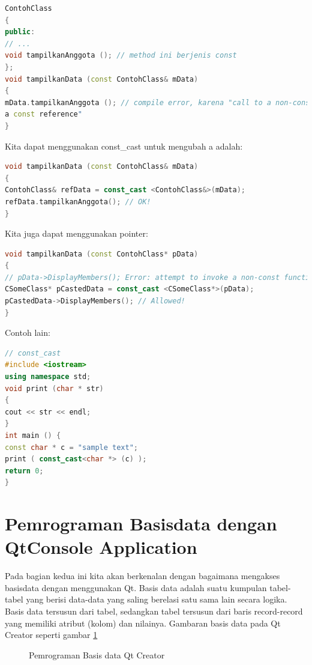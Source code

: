 \begin{lstlisting}[language=c++, numbers=none]
ContohClass
{
public:
// ...
void tampilkanAnggota (); // method ini berjenis const
};
void tampilkanData (const ContohClass& mData)
{
mData.tampilkanAnggota (); // compile error, karena "call to a non-const member using
a const reference"
}
\end{lstlisting}

Kita dapat menggunakan const\_cast untuk mengubah a adalah:

\begin{lstlisting}[language=c++, numbers=none]
void tampilkanData (const ContohClass& mData)
{
ContohClass& refData = const_cast <ContohClass&>(mData);
refData.tampilkanAnggota(); // OK!
}
\end{lstlisting}

Kita juga dapat menggunakan pointer:

\begin{lstlisting}[language=c++, numbers=none]
void tampilkanData (const ContohClass* pData)
{
// pData->DisplayMembers(); Error: attempt to invoke a non-const function!
CSomeClass* pCastedData = const_cast <CSomeClass*>(pData);
pCastedData->DisplayMembers(); // Allowed!
}
\end{lstlisting}

Contoh lain:

\begin{lstlisting}[language=c++, numbers=none]
// const_cast
#include <iostream>
using namespace std;
void print (char * str)
{
cout << str << endl;
}
int main () {
const char * c = "sample text";
print ( const_cast<char *> (c) );
return 0;
}
\end{lstlisting}

\section{Pemrograman Basisdata dengan QtConsole Application}\label{pemrograman-basisdata-dengan-qtconsole-application}

Pada bagian kedua ini kita akan berkenalan dengan bagaimana mengakses
basisdata dengan menggunakan Qt. Basis data adalah suatu kumpulan
tabel-tabel yang berisi data-data yang saling berelasi satu sama lain
secara logika. Basis data tersusun dari tabel, sedangkan tabel tersusun
dari baris record-record yang memiliki atribut (kolom) dan nilainya.
Gambaran basis data pada Qt Creator seperti gambar \ref{fig:basis-data-qt}

\begin{figure}
\centering
{}
\caption{Pemrograman Basis data Qt Creator}
\label{fig:basis-data-qt}
\end{figure}


